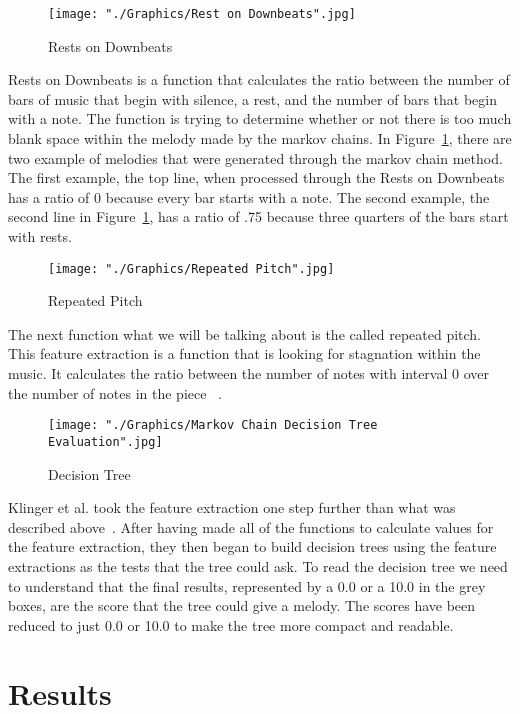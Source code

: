 \documentclass{sig-alternate}
\begin{document}
\begin{figure}[H]
\texttt{[image: "./Graphics/Rest on Downbeats".jpg]}
\caption{Rests on Downbeats}
\label{fig:restsondownbeats}
\end{figure}

	Rests on Downbeats is a function that calculates the ratio between the number of bars of music that begin with silence, a rest, and the number of bars that begin with a note. The function is trying to determine whether or not there is too much blank space within the melody made by the markov chains. In Figure~\ref{fig:restsondownbeats}, there are two example of melodies that were generated through the markov chain method. The first example, the top line, when processed through the Rests on Downbeats has a ratio of 0 because every bar starts with a note. The second example, the second line in Figure~\ref{fig:restsondownbeats}, has a ratio of .75 because three quarters of the bars start with rests.

\begin{figure}[H]
\texttt{[image: "./Graphics/Repeated Pitch".jpg]}
\caption{Repeated Pitch}
\label{fig:repeatedpitch}
\end{figure}

	The next function what we will be talking about is the called repeated pitch. This feature extraction is a function that is looking for stagnation within the music. It calculates the ratio between the number of notes with interval 0 over the number of notes in the piece ~\cite{Klinger}.

\begin{figure}[H]
\texttt{[image: "./Graphics/Markov Chain Decision Tree Evaluation".jpg]}
\caption{Decision Tree}
\label{fig:DecisionTreeEval}
\end{figure}

Klinger et al. took the feature extraction one step further than what was described above~\cite{cit:Klinger}. After having made all of the functions to calculate values for the feature extraction, they then began to build decision trees using the feature extractions as the tests that the tree could ask. To read the decision tree we need to understand that the final results, represented by a 0.0 or a 10.0 in the grey boxes, are the score that the tree could give a melody. The scores have been reduced to just 0.0 or 10.0 to make the tree more compact and readable. 

\section{Results}
\label{sec:results}
\end{document}
